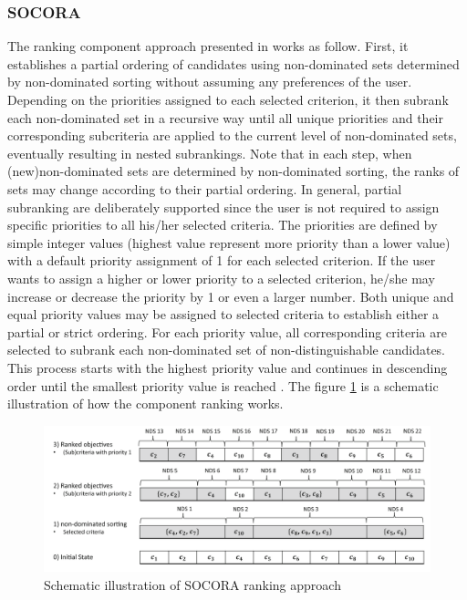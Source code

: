 \subsubsection{SOCORA}
The ranking component approach presented in \cite{Kessel2016} works as follow. First, it establishes a partial ordering of candidates using non-dominated sets determined by non-dominated sorting without assuming any preferences of the user. Depending on the priorities assigned to each selected criterion, it then subrank each non-dominated set in a recursive way until all unique priorities and their corresponding subcriteria are applied to the current level of non-dominated sets, eventually resulting in nested subrankings. Note that in each step, when (new)non-dominated sets are determined by non-dominated sorting, the ranks of sets may change according to their partial ordering. In general, partial subranking are deliberately supported since the user is not required to assign specific priorities to all his/her selected criteria. The priorities are defined by simple integer values (highest value represent more priority than a lower value) with a default priority assignment of 1 for each selected criterion. If the user wants to assign a higher or lower priority to a selected criterion, he/she may increase or decrease the priority by 1 or even a larger number. Both unique and equal priority values may be assigned to selected criteria to establish either a partial or strict ordering. For each priority value, all corresponding criteria are selected to subrank each non-dominated set of non-distinguishable candidates. This process starts with the highest priority value and continues in descending order until the smallest priority value is reached \cite{Kessel2016}. The figure \ref{fig:socora-ex} is a schematic illustration of how the component ranking works.

\begin{figure}[ht]
	\centering
    \includegraphics[width=\textwidth]{grafiken/socoraExample}
    \caption{Schematic illustration of SOCORA ranking approach \cite{Kessel2016}}
    \label{fig:socora-ex}
\end{figure}


